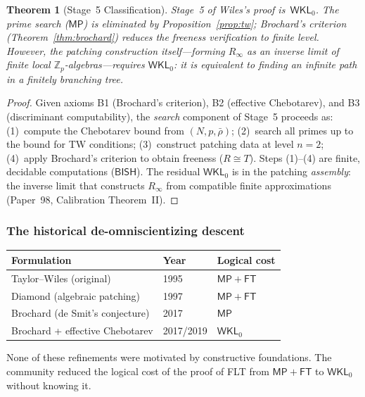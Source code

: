 \documentclass[11pt]{article}
\theoremstyle{plain}
\newtheorem{theorem}{Theorem}[section]
\theoremstyle{definition}
\theoremstyle{remark}
\newcommand{\Z}{\mathbb{Z}}
\newcommand{\BISH}{\mathsf{BISH}}
\newcommand{\MP}{\mathsf{MP}}
\newcommand{\FT}{\mathsf{FT}}
\newcommand{\WKL}{\mathsf{WKL}_0}
\begin{document}
\begin{theorem}[Stage~5 Classification]\label{thm:stage5}
Stage~5 of Wiles's proof is~$\WKL$.  The prime search ($\MP$)
is eliminated by Proposition~\ref{prop:tw}; Brochard's criterion
(Theorem~\ref{thm:brochard}) reduces the freeness verification to
finite level.  However, the patching construction
itself---forming $R_\infty$ as an inverse limit of finite
local $\Z_p$-algebras---requires $\WKL$: it is equivalent to
finding an infinite path in a finitely branching tree.
\end{theorem}

\begin{proof}
Given axioms B1 (Brochard's criterion), B2 (effective Chebotarev),
and B3 (discriminant computability), the \emph{search} component of
Stage~5 proceeds as:
(1)~compute the Chebotarev bound from $(N,p,\bar{\rho})$;
(2)~search all primes up to the bound for TW conditions;
(3)~construct patching data at level $n = 2$;
(4)~apply Brochard's criterion to obtain freeness ($R \cong T$).
Steps (1)--(4) are finite, decidable computations ($\BISH$).
The residual $\WKL$ is in the patching \emph{assembly}: the
inverse limit that constructs $R_\infty$ from compatible finite
approximations (Paper~98, Calibration Theorem~II).
\end{proof}

\subsubsection{The historical de-omniscientizing descent}

\begin{center}
\renewcommand{\arraystretch}{1.15}
\begin{tabular}{@{}lll@{}}
\toprule
\textbf{Formulation} & \textbf{Year} & \textbf{Logical cost} \\
\midrule
Taylor--Wiles (original) & 1995 & $\MP + \FT$ \\
Diamond (algebraic patching) & 1997 & $\MP + \FT$ \\
Brochard (de Smit's conjecture) & 2017 & $\MP$ \\
Brochard + effective Chebotarev & 2017/2019 & $\WKL$ \\
\bottomrule
\end{tabular}
\end{center}

\medskip\noindent
None of these refinements were motivated by constructive
foundations.  The community reduced the logical cost of the
proof of FLT from $\MP + \FT$ to $\WKL$ without knowing it.
\end{document}
